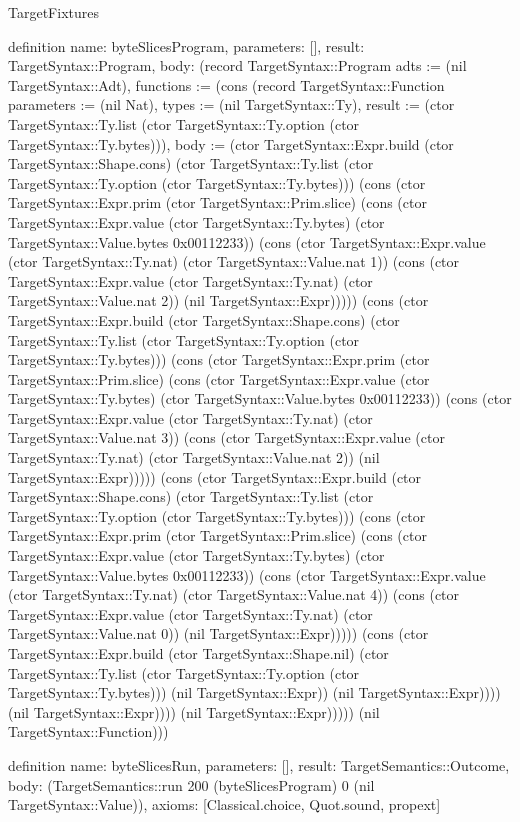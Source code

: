 \begin{lexlean}{TargetFixtures}
\begin{semanticmodule}
definition{
  name: byteSlicesProgram,
  parameters: [],
  result: TargetSyntax::Program,
  body: (record TargetSyntax::Program {adts := (nil TargetSyntax::Adt), functions := (cons (record TargetSyntax::Function {parameters := (nil Nat), types := (nil TargetSyntax::Ty), result := (ctor TargetSyntax::Ty.list (ctor TargetSyntax::Ty.option (ctor TargetSyntax::Ty.bytes))), body := (ctor TargetSyntax::Expr.build (ctor TargetSyntax::Shape.cons) (ctor TargetSyntax::Ty.list (ctor TargetSyntax::Ty.option (ctor TargetSyntax::Ty.bytes))) (cons (ctor TargetSyntax::Expr.prim (ctor TargetSyntax::Prim.slice) (cons (ctor TargetSyntax::Expr.value (ctor TargetSyntax::Ty.bytes) (ctor TargetSyntax::Value.bytes 0x00112233)) (cons (ctor TargetSyntax::Expr.value (ctor TargetSyntax::Ty.nat) (ctor TargetSyntax::Value.nat 1)) (cons (ctor TargetSyntax::Expr.value (ctor TargetSyntax::Ty.nat) (ctor TargetSyntax::Value.nat 2)) (nil TargetSyntax::Expr))))) (cons (ctor TargetSyntax::Expr.build (ctor TargetSyntax::Shape.cons) (ctor TargetSyntax::Ty.list (ctor TargetSyntax::Ty.option (ctor TargetSyntax::Ty.bytes))) (cons (ctor TargetSyntax::Expr.prim (ctor TargetSyntax::Prim.slice) (cons (ctor TargetSyntax::Expr.value (ctor TargetSyntax::Ty.bytes) (ctor TargetSyntax::Value.bytes 0x00112233)) (cons (ctor TargetSyntax::Expr.value (ctor TargetSyntax::Ty.nat) (ctor TargetSyntax::Value.nat 3)) (cons (ctor TargetSyntax::Expr.value (ctor TargetSyntax::Ty.nat) (ctor TargetSyntax::Value.nat 2)) (nil TargetSyntax::Expr))))) (cons (ctor TargetSyntax::Expr.build (ctor TargetSyntax::Shape.cons) (ctor TargetSyntax::Ty.list (ctor TargetSyntax::Ty.option (ctor TargetSyntax::Ty.bytes))) (cons (ctor TargetSyntax::Expr.prim (ctor TargetSyntax::Prim.slice) (cons (ctor TargetSyntax::Expr.value (ctor TargetSyntax::Ty.bytes) (ctor TargetSyntax::Value.bytes 0x00112233)) (cons (ctor TargetSyntax::Expr.value (ctor TargetSyntax::Ty.nat) (ctor TargetSyntax::Value.nat 4)) (cons (ctor TargetSyntax::Expr.value (ctor TargetSyntax::Ty.nat) (ctor TargetSyntax::Value.nat 0)) (nil TargetSyntax::Expr))))) (cons (ctor TargetSyntax::Expr.build (ctor TargetSyntax::Shape.nil) (ctor TargetSyntax::Ty.list (ctor TargetSyntax::Ty.option (ctor TargetSyntax::Ty.bytes))) (nil TargetSyntax::Expr)) (nil TargetSyntax::Expr)))) (nil TargetSyntax::Expr)))) (nil TargetSyntax::Expr))))}) (nil TargetSyntax::Function))})
}

definition{
  name: byteSlicesRun,
  parameters: [],
  result: TargetSemantics::Outcome,
  body: (TargetSemantics::run 200 (byteSlicesProgram) 0 (nil TargetSyntax::Value)),
  axioms: [Classical.choice, Quot.sound, propext]
}


\end{semanticmodule}
\end{lexlean}
